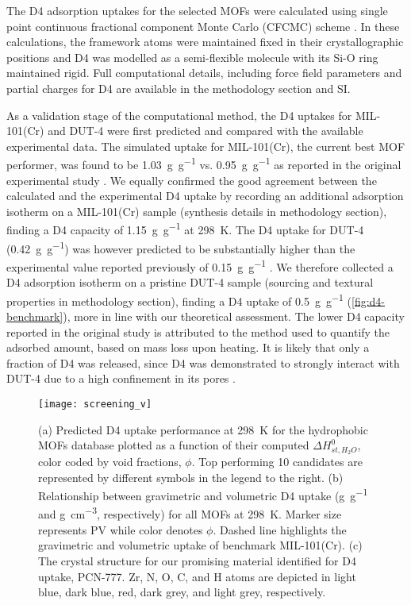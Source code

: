 The D4 adsorption uptakes for the selected MOFs were calculated using single
point continuous fractional component Monte Carlo (CFCMC) scheme
\citep{rahbariRecentAdvancesContinuous2020}. In these calculations, the
framework atoms were maintained fixed in their crystallographic positions and D4
was modelled as a semi-flexible molecule with its Si-O ring maintained rigid.
Full computational details, including force field parameters and partial charges
for D4 are available in the methodology section and SI.

As a validation stage of the computational method, the D4 uptakes for
MIL-101(Cr) and DUT-4 were first predicted and compared with the available
experimental data. The simulated uptake for MIL-101(Cr), the current best MOF
performer, was found to be \SI{1.03}{\gram\per\gram} vs.
\SI{0.95}{\gram\per\gram} as reported in the original experimental study
\citep{gargiuloChromiumbasedMIL101Metal2019}. We equally confirmed the good
agreement between the calculated and the experimental D4 uptake by recording an
additional adsorption isotherm on a MIL-101(Cr) sample (synthesis details in
methodology section), finding a D4 capacity of \SI{1.15}{\gram\per\gram} at
\SI{298}{\kelvin}. The D4 uptake for DUT-4 (\SI{0.42}{\gram\per\gram}) was
however predicted to be substantially higher than the experimental value
reported previously of \SI{0.15}{\gram\per\gram}
\citep{mito-okaSiloxaneD4Capture2013}. We therefore collected a D4 adsorption
isotherm on a pristine DUT-4 sample (sourcing and textural properties in
methodology section), finding a D4 uptake of \SI{0.5}{\gram\per\gram}
(\cref{fig:d4-benchmark}), more in line with our theoretical assessment. The
lower D4 capacity reported in the original study is attributed to the method
used to quantify the adsorbed amount, based on mass loss upon heating. It is
likely that only a fraction of D4 was released, since D4 was demonstrated to
strongly interact with DUT-4 due to a high confinement in its pores
\citep{mito-okaSiloxaneD4Capture2013}.

\begin{figure}[htb]
    \centering
    \texttt{[image: screening\_v]}
    \caption{%
        (a) Predicted D4 uptake performance at \SI{298}{\kelvin} for the hydrophobic
        MOFs database plotted as a function of their computed \(\Delta H_{st,H_{2}O}^{0}\),
        color coded by void fractions, \(\phi\). Top performing 10 candidates are
        represented by different symbols in the legend to the right. (b) Relationship
        between gravimetric and volumetric D4 uptake (\si{\gram\per\gram} and
        \si{\gram\per\centi\metre\cubed}, respectively) for all MOFs at
        \SI{298}{\kelvin}. Marker size represents PV while color denotes \(\phi\).
        Dashed line highlights the gravimetric and volumetric uptake of benchmark
        MIL-101(Cr)\citep{gargiuloChromiumbasedMIL101Metal2019}. (c) The crystal
        structure for our promising material identified for D4 uptake, PCN-777. Zr, N,
        O, C, and H atoms are depicted in light blue, dark blue, red, dark grey, and
        light grey, respectively.
    }\label{fig:d4-screening}
\end{figure}

